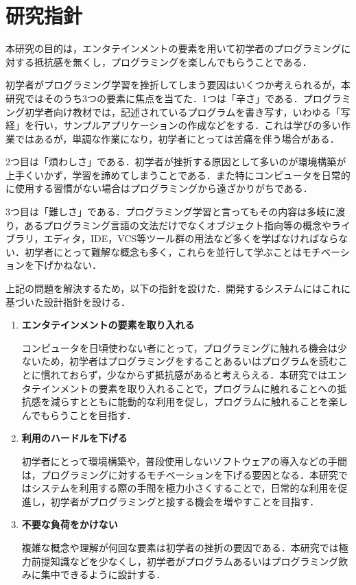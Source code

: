 \section{研究指針}

本研究の目的は，エンタテインメントの要素を用いて初学者のプログラミングに対する抵抗感を無くし，プログラミングを楽しんでもらうことである．

初学者がプログラミング学習を挫折してしまう要因はいくつか考えられるが，本研究ではそのうち3つの要素に焦点を当てた．1つは「辛さ」である．プログラミング初学者向け教材では，記述されているプログラムを書き写す，いわゆる「写経」を行い，サンプルアプリケーションの作成などをする．これは学びの多い作業ではあるが，単調な作業になり，初学者にとっては苦痛を伴う場合がある．


2つ目は「煩わしさ」である．初学者が挫折する原因として多いのが環境構築が上手くいかず，学習を諦めてしまうことである．また特にコンピュータを日常的に使用する習慣がない場合はプログラミングから遠ざかりがちである．


3つ目は「難しさ」である．プログラミング学習と言ってもその内容は多岐に渡り，あるプログラミング言語の文法だけでなくオブジェクト指向等の概念やライブラリ，エディタ，IDE，VCS等ツール群の用法など多くを学ばなければならない．初学者にとって難解な概念も多く，これらを並行して学ぶことはモチベーションを下げかねない．

上記の問題を解決するため，以下の指針を設けた．開発するシステムにはこれに基づいた設計指針を設ける．

\begin{enumerate}
  \item {\bf エンタテインメントの要素を取り入れる}

  コンピュータを日頃使わない者にとって，プログラミングに触れる機会は少ないため，初学者はプログラミングをすることあるいはプログラムを読むことに慣れておらず，少なからず抵抗感があると考えらえる．本研究ではエンタテインメントの要素を取り入れることで，プログラムに触れることへの抵抗感を減らすとともに能動的な利用を促し，プログラムに触れることを楽しんでもらうことを目指す．

  \item {\bf 利用のハードルを下げる}

  初学者にとって環境構築や，普段使用しないソフトウェアの導入などの手間は，プログラミングに対するモチベーションを下げる要因となる．本研究ではシステムを利用する際の手間を極力小さくすることで，日常的な利用を促進し，初学者がプログラミングと接する機会を増やすことを目指す．

  \item {\bf 不要な負荷をかけない}

  複雑な概念や理解が何回な要素は初学者の挫折の要因である．本研究では極力前提知識などを少なくし，初学者がプログラムあるいはプログラミング飲みに集中できるように設計する．
\end{enumerate}